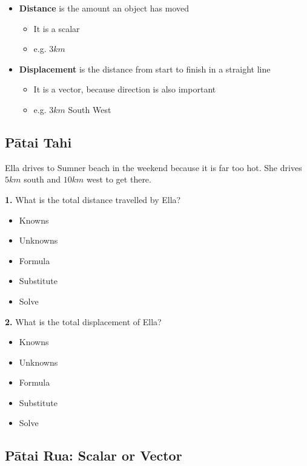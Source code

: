 \documentclass{report}
\begin{document}
\begin{itemize}
    \item \textbf{Distance} is the amount an object has moved
    \begin{itemize}
        \item It is a scalar
        \item e.g. $3km$
    \end{itemize}
    \item \textbf{Displacement} is the distance from start to finish in a straight line
    \begin{itemize}
        \item It is a vector, because direction is also important
        \item e.g. $3km$ South West
    \end{itemize}
\end{itemize}

\subsection{Pātai Tahi}

Ella drives to Sumner beach in the weekend because it is far too hot. She drives $5km$ south and $10km$ west to get there.

\textbf{1.} What is the total distance travelled by Ella?

\begin{itemize}
\item Knowns
\item Unknowns
\item Formula 
\item Substitute
\item Solve
\end{itemize}

\vspace{2cm}

\textbf{2.} What is the total displacement of Ella?

\begin{itemize}
\item Knowns
\item Unknowns
\item Formula 
\item Substitute
\item Solve
\end{itemize}

\vspace{2cm}

\subsection{Pātai Rua: Scalar or Vector}
\end{document}
